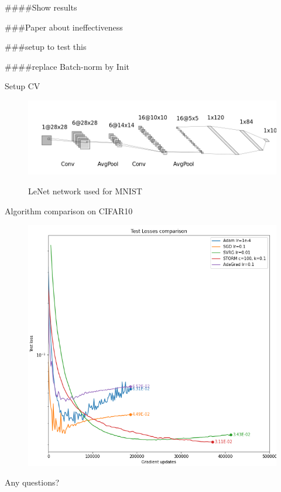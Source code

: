 \documentclass[10pt]{beamer}
\begin{document}
####Show results

###Paper about ineffectiveness

###setup to test this

####replace Batch-norm by Init

\begin{frame}{Setup CV}
    \begin{figure}
        \centering
    \includegraphics[scale=0.4]{midterm presentation/images/LeNet.png}
        \label{fig:lenet}
        \caption{LeNet network used for MNIST}
    \end{figure} 
    
\end{frame}

\begin{frame}{Algorithm comparison on CIFAR10}
    \begin{figure}
        \centering
    \includegraphics[scale=0.35]{midterm presentation/images/testLossesMnist.png}
        \label{fig:testLossesMnist}
    \end{figure}   
\end{frame}

\begin{frame}{ }
\begin{center}
     \Huge Any questions?
\end{center}
   
\end{frame}
\end{document}
